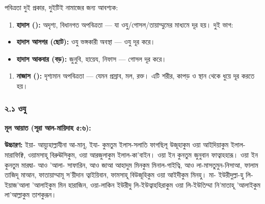 পবিত্রতা দুই প্রকার, দুইটিই নামাজের জন্য আবশ্যক:

\begin{enumerate}
\item \textbf{হাদাস ():} অদৃশ্য, বিধানগত অপবিত্রতা — যা ওযু/গোসল/তায়াম্মুমের মাধ্যমে দূর হয়। দুই ভাগ:
\end{enumerate}
\begin{itemize}
\item \textbf{হাদাস আসগর (ছোট):} ওযু ভঙ্গকারী অবস্থা — ওযু দূর করে।
\item \textbf{হাদাস আকবার (বড়):} জুনুবি, হায়েয, নিফাস — গোসল দূর করে।
\end{itemize}
\begin{enumerate}
\item \textbf{নাজাস ():} দৃশ্যমান অপবিত্রতা — যেমন প্রস্রাব, মল, রক্ত। এটি শরীর, কাপড় ও স্থান থেকে ধুয়ে দূর করতে হয়।
\end{enumerate}
\subsubsection*{২.১ ওযু}

\textbf{মূল আয়াত (সূরা আল-মায়িদাহ ৫:৬):}

\begin{center}\end{center}

\textbf{উচ্চারণ:} ইয়া- আয়্যুহাল্লাযীনা আ-মানূ, ইযা- কুমতুম ইলাস-সলাতি ফাগছিলূ উজূহাকুম ওয়া আইদিয়াকুম ইলাল-মারাফিক্বি, ওয়ামসাহূ বিরুঊসিকুম, ওয়া আরজুলাকুম ইলাল-কা'বাইন। ওয়া ইন কুনতুম জুনুবান ফাত্বাহহারূ। ওয়া ইন কুনতুম মারদ্বা- আও 'আলা- সাফারিন, আও জাআ আহাদুম মিনকুম মিনাল-গাইত্বি, আও লা-মাসতুমুন-নিসাআ, ফালাম তাজিদূ মাআন, ফাতায়াম্মামূ স'য়ীদান ত্বাইয়িবান, ফামসাহূ বিউজূহিকুম ওয়া আইদীকুম মিনহু। মা- ইউরীদুল্লা-হু লি-ইয়াজ'আলা 'আলাইকুম মিন হারাজিন, ওয়া-লাকিন ইউরীদু লি-ইউত্বাহহিরাকুম ওয়া লি-ইউতিম্মা নি'মাতাহূ 'আলাইকুম লা'আল্লাকুম তাশকুরূন।

